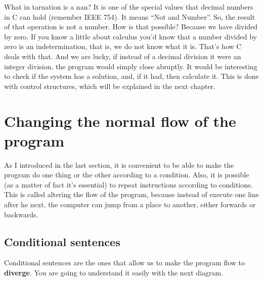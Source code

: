 \documentclass[a4paper]{article}
\begin{document}
What in tarnation is a nan? It is one of the special values that decimal numbers
in C can hold (remember IEEE 754). It means ``Not and Number''.
So, the result of that operation is not a number. How is that
possible? Because we have divided by zero. If you know a little about calculus
you'd know that a number divided by zero is an indetermination, that is, we do
not know what it is. That's how C deals with that. And we are lucky, if instead
of a decimal division it were an integer division, the program would simply
close abruptly. It would be interesting to check if the system has a solution,
and, if it had, then calculate it. This is done with control structures, which
will be explained in the next chapter.

\section{Changing the normal flow of the program}
As I introduced in the last section, it is convenient to be able to make the
program do one thing or the other according to a condition. Also, it is possible
(as a matter of fact it's essential) to repeat instructions according to
conditions. This is called altering the flow of the program, because instead
of execute one line after he next, the computer can jump from
a place to another, either forwards or backwards.

\subsection{Conditional sentences}
Conditional sentences are the ones that allow us to make the program flow
to \textbf{diverge}. You are going to understand it easily with the next
diagram.
\end{document}
